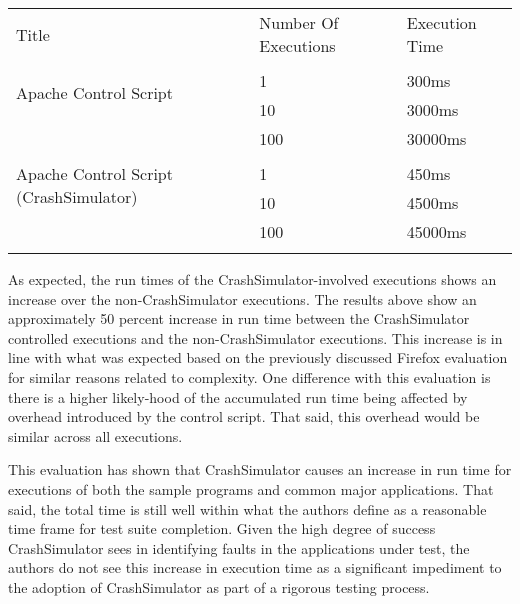                 \begin{table}[H]
                    \scriptsize{}
                    \begin{tabular}{l l l}
                        \toprule{}
                        Title & Number Of Executions & Execution Time \\
                        \multirow{3}{*}{Apache Control Script} \\
                        & 1 & 300ms \\
                        & 10 & 3000ms \\
                        & 100 & 30000ms \\
                        \multirow{3}{*}{Apache Control Script (CrashSimulator)} \\
                        & 1 & 450ms \\
                        & 10 & 4500ms \\
                        & 100 & 45000ms \\
                        \bottomrule{}
                    \end{tabular}
                \end{table}

                As expected, the run times of the CrashSimulator-involved executions shows an increase over the
                non-CrashSimulator executions. The results above show an approximately 50 percent increase in run time
                between the CrashSimulator controlled executions and the non-CrashSimulator executions. This increase is
                in line with what was expected based on the previously discussed Firefox evaluation for similar reasons
                related to complexity. One difference with this evaluation is there is a higher likely-hood of the
                accumulated run time being affected by overhead introduced by the control script. That said, this
                overhead would be similar across all executions.

                This evaluation has shown that CrashSimulator causes an increase in run time for executions of both the
                sample programs and common major applications. That said, the total time is still well within what the
                authors define as a reasonable time frame for test suite completion. Given the high degree of success
                CrashSimulator sees in identifying faults in the applications under test, the authors do not see this
                increase in execution time as a significant impediment to the adoption of CrashSimulator as part of a
                rigorous testing process.

